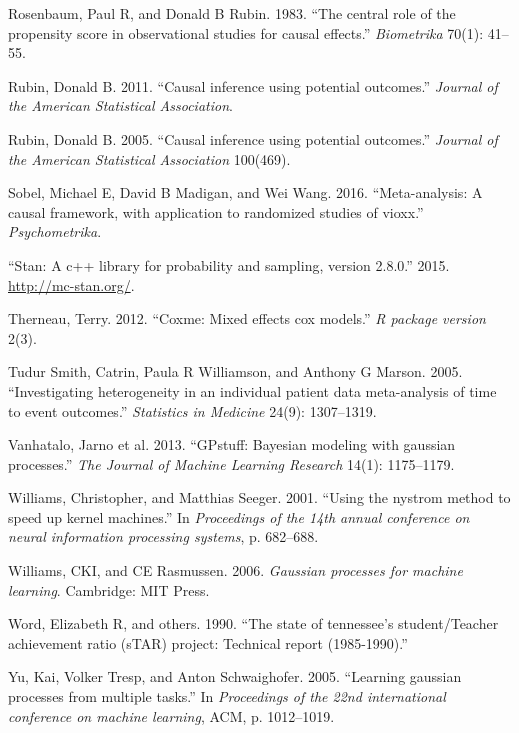 Rosenbaum, Paul R, and Donald B Rubin. 1983. ``The central role of the
propensity score in observational studies for causal effects.''
\emph{Biometrika} 70(1): 41--55.

Rubin, Donald B. 2011. ``Causal inference using potential outcomes.''
\emph{Journal of the American Statistical Association}.

Rubin, Donald B. 2005. ``Causal inference using potential outcomes.''
\emph{Journal of the American Statistical Association} 100(469).

Sobel, Michael E, David B Madigan, and Wei Wang. 2016. ``Meta-analysis:
A causal framework, with application to randomized studies of vioxx.''
\emph{Psychometrika}.

``Stan: A c++ library for probability and sampling, version 2.8.0.''
2015. \url{http://mc-stan.org/}.

Therneau, Terry. 2012. ``Coxme: Mixed effects cox models.'' \emph{R
package version} 2(3).

Tudur Smith, Catrin, Paula R Williamson, and Anthony G Marson. 2005.
``Investigating heterogeneity in an individual patient data
meta-analysis of time to event outcomes.'' \emph{Statistics in Medicine}
24(9): 1307--1319.

Vanhatalo, Jarno et al. 2013. ``GPstuff: Bayesian modeling with gaussian
processes.'' \emph{The Journal of Machine Learning Research} 14(1):
1175--1179.

Williams, Christopher, and Matthias Seeger. 2001. ``Using the nystrom
method to speed up kernel machines.'' In \emph{Proceedings of the 14th
annual conference on neural information processing systems}, p.
682--688.

Williams, CKI, and CE Rasmussen. 2006. \emph{Gaussian processes for
machine learning}. Cambridge: MIT Press.

Word, Elizabeth R, and others. 1990. ``The state of tennessee's
student/Teacher achievement ratio (sTAR) project: Technical report
(1985-1990).''

Yu, Kai, Volker Tresp, and Anton Schwaighofer. 2005. ``Learning gaussian
processes from multiple tasks.'' In \emph{Proceedings of the 22nd
international conference on machine learning}, ACM, p. 1012--1019.
